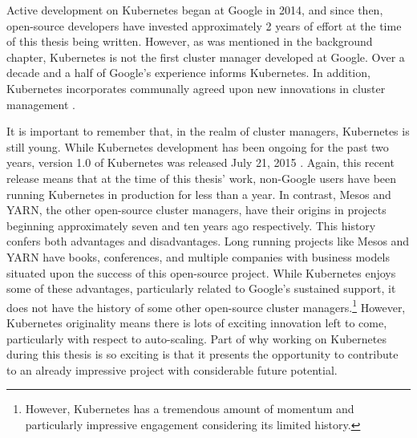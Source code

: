 Active development on Kubernetes began at Google in 2014, and since then,
open-source developers have invested approximately 2 years of effort at the time
of this thesis being written. However,
as was mentioned in the background chapter, Kubernetes is not the first cluster
manager developed at Google. Over a decade and a half of Google's experience
informs Kubernetes. In addition, Kubernetes incorporates communally agreed upon new
innovations in cluster management \cite{what-is-k8s}.

It is important to remember that, in the realm of cluster managers, Kubernetes
is still young. While Kubernetes development has been ongoing for the past two
years, version 1.0 of Kubernetes was released July 21, 2015
\cite{k8s-v1-release}. Again, this recent release means that at the time of this
thesis' work, non-Google users have been running Kubernetes in production for
less than a year. In contrast, Mesos and YARN, the other open-source cluster
managers, have their origins in projects beginning approximately seven and ten years
ago respectively. This history confers both advantages and disadvantages. Long
running projects like Mesos and YARN have books, conferences, and multiple
companies with business models situated upon the success of this open-source
project. While Kubernetes enjoys some of these advantages, particularly related
to Google's sustained support, it does not have the history of some other
open-source cluster managers.\footnote{However, Kubernetes has a tremendous
amount of momentum and particularly impressive engagement considering its
limited history.} However, Kubernetes originality means there is lots of
exciting innovation left to come, particularly with respect to auto-scaling.
Part of why working on Kubernetes during this thesis is so exciting is that it
presents the opportunity to contribute to an already impressive project with
considerable future potential.
